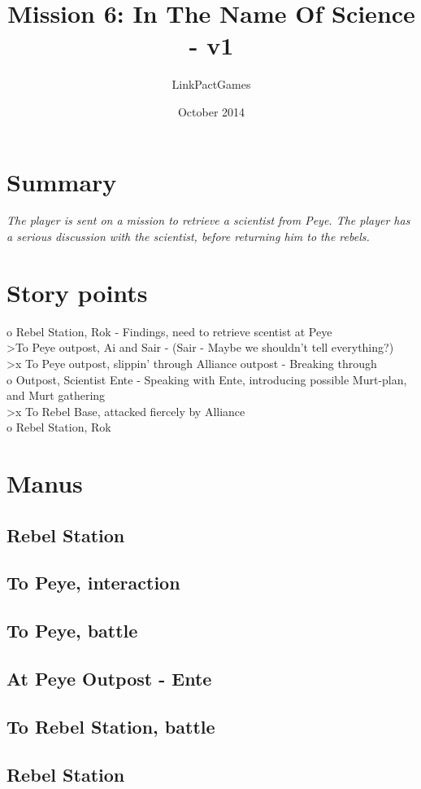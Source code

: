 \documentclass[a4paper,12pt]{article}
\begin{document}
\title{Mission 6: In The Name Of Science - v1}
\author{LinkPactGames}
\date{October 2014}
\maketitle

\section{Summary}

\textit{The player is sent on a mission to retrieve a scientist from Peye.
The player has a serious discussion with the scientist, before returning him
to the rebels.}

\section{Story points}

o Rebel Station, Rok - Findings, need to retrieve scentist at Peye\\
\textgreater To Peye outpost, Ai and Sair - (Sair - Maybe we shouldn't tell everything?)\\
\textgreater x To Peye outpost, slippin' through Alliance outpost - Breaking through\\
o Outpost, Scientist Ente - Speaking with Ente, introducing possible Murt-plan, and Murt
gathering\\
\textgreater x To Rebel Base, attacked fiercely by Alliance\\
o Rebel Station, Rok\\

\section{Manus}

\subsection{Rebel Station}

\subsection{To Peye, interaction}

\subsection{To Peye, battle}

\subsection{At Peye Outpost - Ente}

\subsection{To Rebel Station, battle}

\subsection{Rebel Station}
\end{document}
